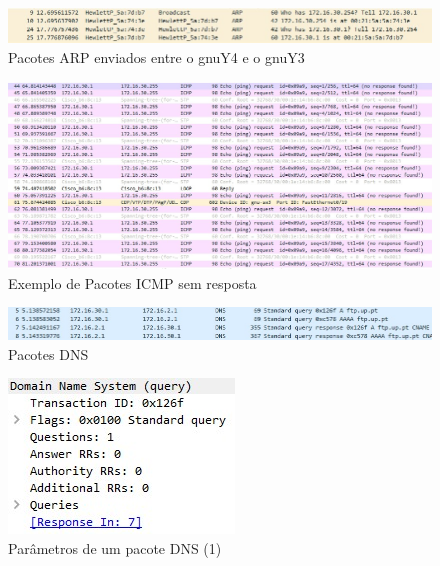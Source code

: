 \documentclass[article, a4paper, 11pt, oneside]{memoir}
\begin{document}
\begin{figure}[htbp]  \label{exp3-arp}
  \centering        
  \includegraphics[scale=0.8]{img/exp3-arp.jpg}
  \caption{Pacotes ARP enviados entre o gnuY4 e o gnuY3}
\end{figure}

\begin{figure}[htbp]  \label{exp2}
  \centering        
  \includegraphics[scale=0.5]{img/exp2.jpg}
  \caption{Exemplo de Pacotes ICMP sem resposta}
\end{figure}

\begin{figure}[htbp]  \label{exp5-dns}
  \centering        
  \includegraphics[scale=0.8]{img/exp5-dns.jpg}
  \caption{Pacotes DNS}
\end{figure}

\begin{figure}[htbp]  \label{exp5-dns-query}
  \centering        
  \includegraphics[scale=0.8]{img/exp5-dns-query.jpg}
  \caption{Parâmetros de um pacote DNS (1)}
\end{figure}
\end{document}
